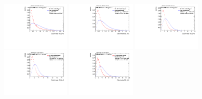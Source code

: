\begin{figure}
\bigskip
\includegraphics[width=0.3\textwidth]{sascha_input/Appendix/Distributions/higgs/distributions/beta2/h_recoJet_D2_2_bin1.pdf} \hspace{1mm}
\includegraphics[width=0.3\textwidth]{sascha_input/Appendix/Distributions/higgs/distributions/beta2/h_recoJet_D2_2_bin2.pdf} \hspace{4mm}
\includegraphics[width=0.3\textwidth]{sascha_input/Appendix/Distributions/higgs/distributions/beta2/h_recoJet_D2_2_bin3.pdf} 
\bigskip
\includegraphics[width=0.3\textwidth]{sascha_input/Appendix/Distributions/higgs/distributions/beta2/h_recoJet_D2_2_bin4.pdf} \hspace{4mm}
\includegraphics[width=0.3\textwidth]{sascha_input/Appendix/Distributions/higgs/distributions/beta2/h_recoJet_D2_2_bin5.pdf} 


\end{figure}
